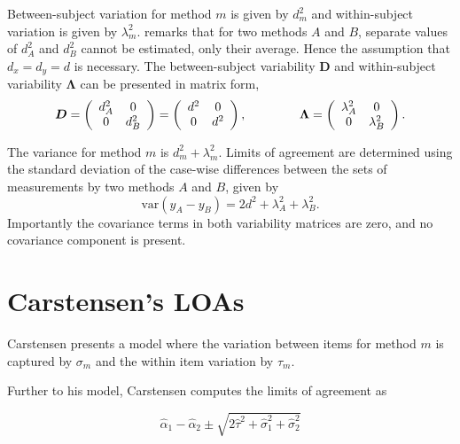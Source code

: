 \documentclass[12pt, a4paper]{report}
\theoremstyle{plain}
\theoremstyle{definition}
\theoremstyle{remark}
\begin{document}
	
	






Between-subject variation for method $m$ is given by $d^2_{m}$ and within-subject variation is given by $\lambda^2_{m}$.  \citet{BXC2008} remarks that for two methods $A$ and $B$, separate values of $d^2_{A}$ and $d^2_{B}$ cannot be estimated, only their average. Hence the assumption that $d_{x}= d_{y}= d$ is necessary. The between-subject variability $\boldsymbol{D}$ and within-subject variability $\boldsymbol{\Lambda}$ can be presented in matrix form,\[
\boldsymbol{D} = \left(%
\begin{array}{cc}
d^2_{A}& 0 \\
0 & d^2_{B} \\
\end{array}%
\right)=\left(%
\begin{array}{cc}
d^2& 0 \\
0 & d^2\\
\end{array}%
\right),
\hspace{1.5cm}
\boldsymbol{\Lambda} = \left(%
\begin{array}{cc}
\lambda^2_{A}& 0 \\
0 & \lambda^2_{B} \\
\end{array}%
\right).
\]

The variance for method $m$ is $d^2_{m}+\lambda^2_{m}$. Limits of agreement are determined using the standard deviation of the case-wise differences between the sets of measurements by two methods $A$ and $B$, given by
\begin{equation}
\mbox{var} (y_{A}-y_{B}) = 2d^2 + \lambda^2_{A}+ \lambda^2_{B}.
\end{equation}
Importantly the covariance terms in both variability matrices are zero, and no covariance component is present.



\section{Carstensen's LOAs}


Carstensen presents a model where the variation between items for
method $m$ is captured by $\sigma_m$ and the within item variation
by $\tau_m$.

Further to his model, Carstensen computes the limits of agreement
as

\[
\hat{\alpha}_1 - \hat{\alpha}_2 \pm \sqrt{2 \hat{\tau}^2 +
	\hat{\sigma}^2_1 + \hat{\sigma}^2_2}
\]
\end{document}
